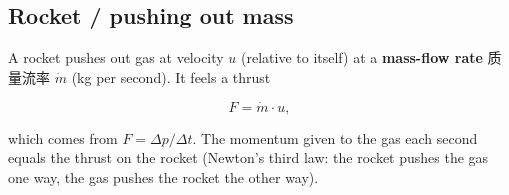 \documentclass[11pt]{article}
\begin{document}
\subsection*{Rocket / pushing out mass}

A rocket pushes out gas at velocity $u$ (relative to itself) at a \textbf{mass-flow rate} 质量流率 $\dot m$ (kg per second). It feels a thrust

\[
F = \dot m \cdot u,
\]

which comes from $F = \Delta p / \Delta t$. The momentum given to the gas each second equals the thrust on the rocket (Newton's third law: the rocket pushes the gas one way, the gas pushes the rocket the other way).
\end{document}
